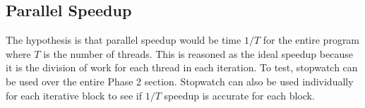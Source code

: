 \documentclass{article}
\begin{document}
\begin{adjustwidth}{-2cm}{-2cm}
\subsection{Parallel Speedup}
The hypothesis is that parallel speedup would be time $1/T$ for the entire program where $T$ is the number of threads. This is reasoned as the ideal speedup because it is the division of work for each thread in each iteration. To test, stopwatch can be used over the entire Phase 2 section. Stopwatch can also be used individually for each iterative block to see if $1/T$ speedup is accurate for each block.
\end{adjustwidth}
\end{document}
